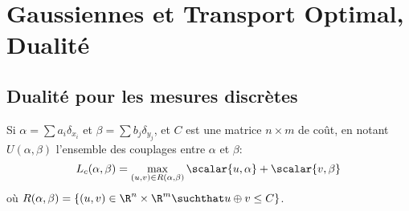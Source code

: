 \section{Gaussiennes et Transport Optimal, Dualité}

\subsection{Dualité pour les mesures discrètes}

\begin{proposition}
	Si $\alpha = \sum a_{i}\delta_{x_{i}}$ et $\beta = \sum b_{j}\delta_{y_{j}}$, et $C$ est une matrice $n \times m$ de coût, en notant $U(\alpha, \beta)$ l'ensemble des couplages entre $\alpha$ et $\beta$:
	\begin{equation*}
		L_{c}(\alpha, \beta) = \max_{(u, v) \in R\left(\alpha, \beta\right)} \scalar{u, \alpha} + \scalar{v, \beta}
	\end{equation*}
	où $R(\alpha, \beta) = \left\{(u, v) \in \R^{n} \times \R^{m} \suchthat u \oplus v \leq C\right\}$.
\end{proposition}
